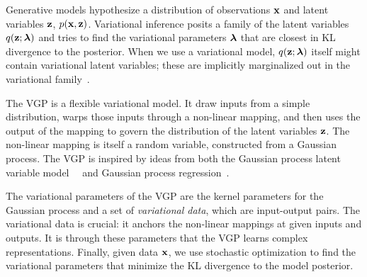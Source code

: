 Generative models hypothesize a distribution
of observations $\boldsymbol{\mathbf{x}}$ and latent variables $\boldsymbol{\mathbf{z}}$, $p(\boldsymbol{\mathbf{x}},\boldsymbol{\mathbf{z}})$.
Variational inference posits a family of the latent variables $q(\boldsymbol{\mathbf{z}}; \boldsymbol{\mathbf{\lambda}})$
and tries to find the variational parameters $\boldsymbol{\mathbf{\lambda}}$ that are closest in
KL divergence to the posterior.  When we use a variational model,
$q(\boldsymbol{\mathbf{z}}; \boldsymbol{\mathbf{\lambda}})$ itself might contain variational latent variables;
these are implicitly marginalized out in the variational family~\citep{ranganath2015hierarchical}.

The \gls{VGP} is a flexible variational
model. It draw inputs from a
simple distribution, warps those inputs through a non-linear mapping,
and then uses the output of the mapping to govern the distribution of
the latent variables $\boldsymbol{\mathbf{z}}$. The non-linear mapping is itself a random
variable, constructed from a Gaussian process.  The
\gls{VGP} is inspired by ideas from both the Gaussian process latent variable
model~~\citep{lawrence2005probabilistic}
and Gaussian process
regression~\citep{rasmussen2006gaussian}.

The variational parameters of the \gls{VGP} are the kernel parameters
for the Gaussian process and a set of \emph{variational data}, which
are input-output pairs.  The variational data is crucial: it
anchors the non-linear mappings at given inputs and outputs. It is
through these parameters that the \gls{VGP} learns complex
representations. Finally, given data $\boldsymbol{\mathbf{x}}$, we use stochastic optimization to
find the variational parameters that minimize the KL divergence to the model posterior.





